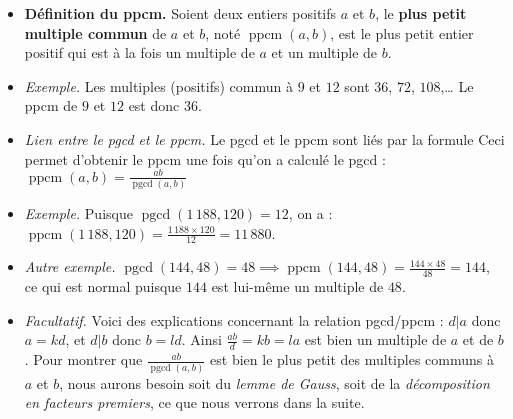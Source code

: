 \documentclass[11pt,class=report,crop=false]{standalone}
\newcommand{\pgcd}{\mathop{\mathrm{pgcd}}\nolimits}
\newcommand{\ppcm}{\mathop{\mathrm{ppcm}}\nolimits}
\begin{document}
\begin{itemize}
    \item \textbf{Définition du ppcm.}
     Soient deux entiers positifs $a$ et $b$, le \textbf{plus petit multiple commun} de $a$ et $b$, noté $\ppcm(a,b)$, est le plus petit entier positif qui est à la fois un multiple de $a$ et un multiple de $b$.
     
     \item \emph{Exemple.} Les multiples (positifs) commun à $9$ et $12$ sont $36$, $72$, $108$,\ldots{} Le ppcm de $9$ et $12$ est donc $36$. 
    
     \item \emph{Lien entre le pgcd et le ppcm.}
     Le pgcd et le ppcm sont liés par la formule 
     \mybox{$ab = \pgcd(a,b) \times \ppcm(a,b)$}
     Ceci permet d'obtenir le ppcm une fois qu'on a calculé le pgcd :
     $\ppcm(a,b)= \frac{ab}{\pgcd(a,b)}$
    
     \item \emph{Exemple.} Puisque $\pgcd(1\,188,120)=12$, on a : $\ppcm(1\,188,120)= \frac{1\,188 \times 120}{12}=11\,880$. 
     
     \item \emph{Autre exemple.} $\pgcd(144,48)=48 \implies \ppcm(144,48)= \frac{144\times48}{48}=144$, ce qui est normal puisque $144$ est lui-même un multiple de $48$.
     
    \item \emph{Facultatif.} Voici des explications concernant la relation pgcd/ppcm : $d|a$ donc $a=kd$, et $d|b$ donc $b=ld$. Ainsi $ \frac{ab}{d} = kb=la$ est bien un multiple de $a$ et de $b$. Pour montrer que $ \frac{ab}{\pgcd(a,b)}$ est bien le plus petit des multiples communs à $a$ et $b$, nous aurons besoin soit du \textit{lemme de Gauss}, soit de la \textit{décomposition en facteurs premiers}, ce que nous verrons dans la suite.

\end{itemize}
\end{document}
